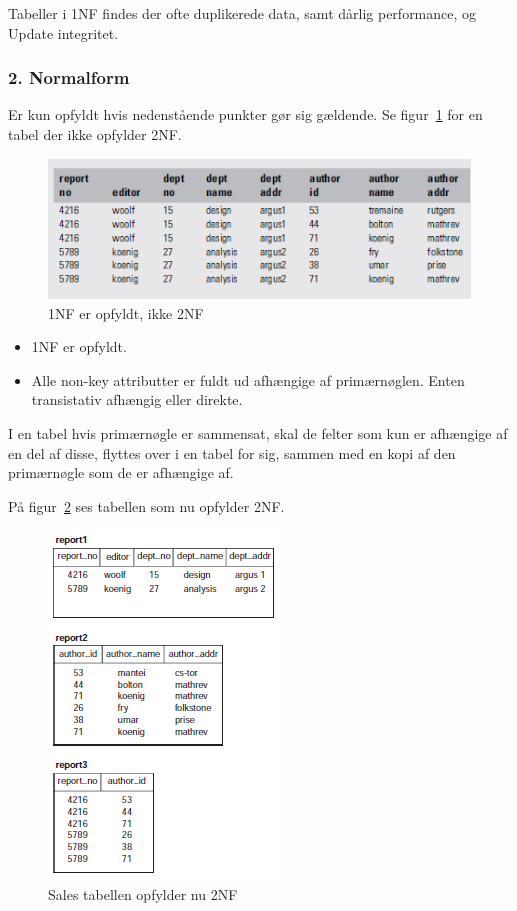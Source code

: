 Tabeller i 1NF findes der ofte duplikerede data, samt dårlig performance, og Update integritet.
	
\subsubsection{2. Normalform}
Er kun opfyldt hvis nedenstående punkter gør sig gældende. Se figur~\ref{fig:not2NF} for en tabel der ikke opfylder 2NF.
	
\begin{figure}[H]
	\centering
	\includegraphics[width=0.8\linewidth]{figs/spm5/not2NF.PNG}
	\caption{1NF er opfyldt, ikke 2NF}
	\label{fig:not2NF}
\end{figure}
	
	
\begin{itemize}
	\item 1NF er opfyldt.
	\item Alle non-key attributter er fuldt ud afhængige af primærnøglen. Enten transistativ afhængig eller direkte.
\end{itemize}
	
I en tabel hvis primærnøgle er sammensat, skal de felter som kun er afhængige af en del af disse, flyttes over i en tabel for sig, sammen med en kopi af den primærnøgle som de er afhængige af.

På figur~\ref{fig:2NF} ses tabellen som nu opfylder 2NF. 

\begin{figure}[H]
	\centering
	\includegraphics[width=0.5\linewidth]{figs/spm5/2NF.PNG}
	\caption{Sales tabellen opfylder nu 2NF}
	\label{fig:2NF}
\end{figure}
	
